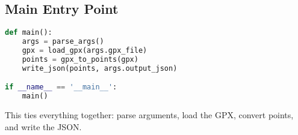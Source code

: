 \documentclass{article}
\begin{document}
\subsection{Main Entry Point}
\begin{lstlisting}[language=Python]
def main():
    args = parse_args()
    gpx = load_gpx(args.gpx_file)
    points = gpx_to_points(gpx)
    write_json(points, args.output_json)

if __name__ == '__main__':
    main()
\end{lstlisting}
This ties everything together: parse arguments, load the GPX, convert points, and write the JSON.
\end{document}
